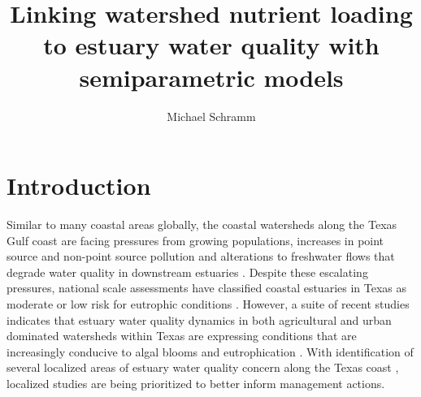 \documentclass[fleqn,10pt,lineno]{wlpeerj} %
\title{Linking watershed nutrient loading to estuary water quality with
semiparametric models}
\author[1]{Michael Schramm}
\affil[1]{Texas Water Resources Institute, Texas A\&M AgriLife Research,
College Station, Texas, United States}
\begin{document}
\flushbottom
\maketitle
\thispagestyle{empty}

\hypertarget{introduction}{%
\section*{Introduction}\label{introduction}}

Similar to many coastal areas globally, the coastal watersheds along the
Texas Gulf coast are facing pressures from growing populations,
increases in point source and non-point source pollution and alterations
to freshwater flows that degrade water quality in downstream estuaries
\autocite{bricker_effects_2008,kennicuttWaterQualityGulf2017,bugica_water_2020}.
Despite these escalating pressures, national scale assessments have
classified coastal estuaries in Texas as moderate or low risk for
eutrophic conditions \autocite{bricker_effects_2008}. However, a suite
of recent studies indicates that estuary water quality dynamics in both
agricultural and urban dominated watersheds within Texas are expressing
conditions that are increasingly conducive to algal blooms and
eutrophication
\autocite{wetzWaterQualityDynamics2016,wetz_exceptionally_2017,bugica_water_2020,chinPhytoplanktonBiomassCommunity2022}.
With identification of several localized areas of estuary water quality
concern along the Texas coast \autocite{bugica_water_2020}, localized
studies are being prioritized to better inform management actions.
\end{document}

